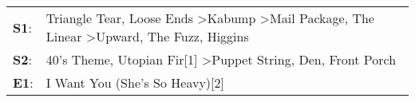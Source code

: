 \begin{supertabular}{p{0.03\textwidth}p{0.92\textwidth}}
 \textbf{S1}:  &  Triangle Tear\textsuperscript{}, \enspace Loose Ends\textsuperscript{} \textgreater \enspace Kabump\textsuperscript{} \textgreater \enspace Mail Package\textsuperscript{}, \enspace The Linear\textsuperscript{} \textgreater \enspace Upward\textsuperscript{}, \enspace The Fuzz\textsuperscript{}, \enspace Higgins\textsuperscript{}  \enspace  \\
 \textbf{S2}:  &                                                                                                                                      40's Theme\textsuperscript{}, \enspace Utopian Fir[1]\textsuperscript{} \textgreater \enspace Puppet String\textsuperscript{}, \enspace Den\textsuperscript{}, \enspace Front Porch\textsuperscript{}  \enspace  \\
 \textbf{E1}:  &                                                                                                                                                                                                                                                                                           I Want You (She's So Heavy)[2]\textsuperscript{}  \enspace  \\
\end{supertabular}
